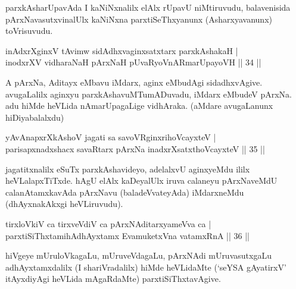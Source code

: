 \begin{artha} 
parxkAsharUpavAda I kaNiNxnalilx elAlx rUpavU niMtiruvudu, 
balavenisida pArxNavasutxvinalUlx kaNiNxna parxtiSeThxyanunx 
(Asharxyavanunx) toVrisuvudu.
\end{artha}


\begin{shl}
inAdxrXginxV tAvimw sidAdhxvaginxsatxtarx parxkAshakaH | \\
inodxrXV vidharaNaH pArxNaH pUvaRyoVnARmarUpayoVH \hfill ||  34 || 
\end{shl}

\begin{artha} 
A pArxNa, Aditayx eMbavu iMdarx, aginx eMbudAgi sidadhxvAgive. 
avugaLalilx aginxyu parxkAshavuMTumADuvadu, iMdarx eMbudeV pArxNa. adu 
hiMde heVLida nAmarUpagaLige vidhAraka. (aMdare avugaLanunx 
hiDiyabalalxdu)
\end{artha}


\begin{shl}
yAvAnapxrXkAshoV jagati sa savoVR\s ginxrihoVcayxteV  | \\
parisapxnadxshacx savaRtarx pArxNa inadxrXsatxthoVcayxteV \hfill ||  35 || 
\end{shl}

\begin{artha} 
jagatitxnalilx eSuTx parxkAshavideyo, adelalxvU aginxyeMdu ililx 
heVLalapxTiTxde. hAgU elAlx kaDeyalUlx iruva calaneyu pArxNaveMdU 
calanAtamxkavAda pArxNavu (baladeVvateyAda) iMdarxneMdu (dhAyxnakAkxgi 
heVLiruvudu).
\end{artha}


\begin{shl}
tirxloVkiV ca tirxveVdiV ca pArxNAditarxyameVva ca | \\
parxtiSiThxtamihAdhAyxtamx EvamuketxVna vatamxRnA \hfill ||  36 || 
\end{shl}

\begin{artha} 
hiVgeye mUruloVkagaLu, mUruveVdagaLu, pArxNAdi mUruvasutxgaLu 
adhAyxtamxdalilx (I shariVradalilx) hiMde heVLidaMte (`seYSA 
gAyatirxV' itAyxdiyAgi heVLida mAgaRdaMte) parxtiSiThxtavAgive.
\end{artha}

